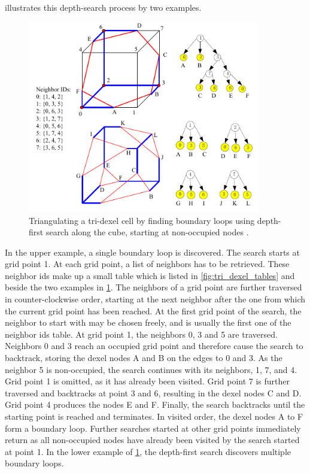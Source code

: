  illustrates this depth-search process by two examples.
%
\begin{figure}
	\centering
	\includegraphics[width=0.9\textwidth]{images/tri_dexel_triangulation}
	\caption{
		Triangulating a tri-dexel cell by finding boundary loops using depth-first search along the cube, starting at non-occupied nodes \cite{tridexel_reconstruction}.
	}
	\label{fig:tri_dexel_triangulation}
\end{figure}
%
In the upper example, a single boundary loop is discovered.
The search starts at grid point 1.
At each grid point, a list of neighbors has to be retrieved.
These neighbor ids make up a small table which is listed in \cref{fig:tri_dexel_tables} and beside the two examples in \cref{fig:tri_dexel_triangulation}.
The neighbors of a grid point are further traversed in counter-clockwise order, starting at the next neighbor after the one from which the current grid point has been reached.
At the first grid point of the search, the neighbor to start with may be chosen freely, and is usually the first one of the neighbor ids table.
At grid point 1, the neighbors 0, 3 and 5 are traversed.
Neighbors 0 and 3 reach an occupied grid point and therefore cause the search to backtrack, storing the dexel nodes A and B on the edges to 0 and 3.
As the neighbor 5 is non-occupied, the search continues with its neighbors, 1, 7, and 4.
Grid point 1 is omitted, as it has already been visited.
Grid point 7 is further traversed and backtracks at point 3 and 6, resulting in the dexel nodes C and D.
Grid point 4 produces the nodes E and F.
Finally, the search backtracks until the starting point is reached and terminates.
In visited order, the dexel nodes A to F form a boundary loop.
Further searches started at other grid points immediately return as all non-occupied nodes have already been visited by the search started at point 1.
%
In the lower example of \cref{fig:tri_dexel_triangulation}, the depth-first search discovers multiple boundary loops.


